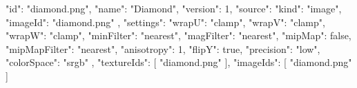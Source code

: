 {
  "id": "diamond.png",
  "name": "Diamond",
  "version": 1,
  "source": {
    "kind": "image",
    "imageId": "diamond.png"
  },
  "settings": {
    "wrapU": "clamp",
    "wrapV": "clamp",
    "wrapW": "clamp",
    "minFilter": "nearest",
    "magFilter": "nearest",
    "mipMap": false,
    "mipMapFilter": "nearest",
    "anisotropy": 1,
    "flipY": true,
    "precision": "low",
    "colorSpace": "srgb"
  },
  "textureIds": [
    "diamond.png"
  ],
  "imageIds": [
    "diamond.png"
  ]
}
